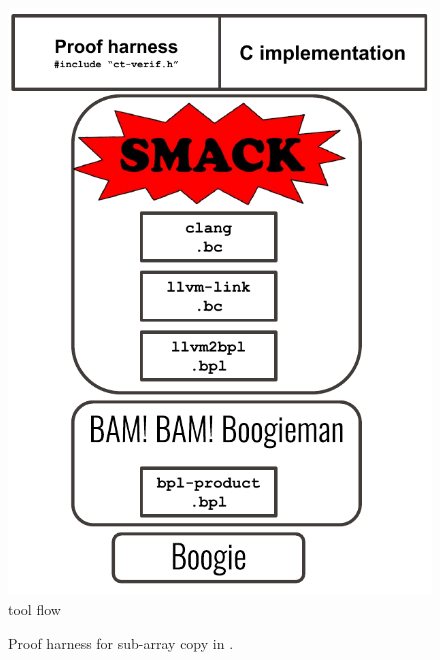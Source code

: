 \begin{figure}[h]
    \centering
    \includegraphics[height=0.4\textheight]{figs/ct-verif-flow.pdf}
    \caption{\ctVerif tool flow}
    \label{fig:ct-verif-flow}
\end{figure}

\begin{figure}[h]
    \centering\resizebox{0.7\columnwidth}{!}{}
    \caption{Proof harness for sub-array copy in .}
    \label{fig:example_wrapper}
\end{figure}